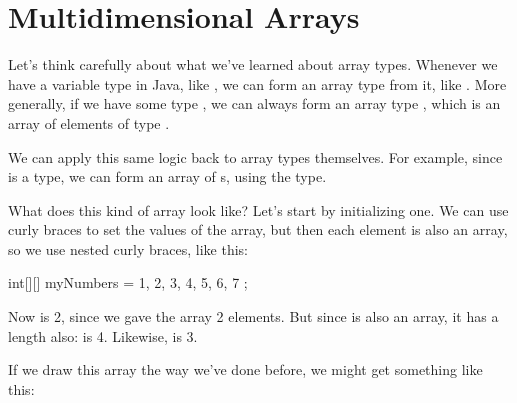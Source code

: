 





\section{Multidimensional Arrays}

Let's think carefully about what we've learned about array types. Whenever we have a variable type in Java, like , we can form an array type from it, like . More generally, if we have some type , we can always form an array type , which is an array of elements of type .

We can apply this same logic back to array types themselves. For example, since  is a type, we can form an array of s, using the  type.

What does this kind of array look like? Let's start by initializing one. We can use curly braces to set the values of the array, but then each element is also an array, so we use nested curly braces, like this:
\begin{code}
int[][] myNumbers = { {1, 2, 3, 4}, {5, 6, 7} };
\end{code}
Now  is 2, since we gave the array 2 elements. But since  is also an array, it has a length also:  is 4. Likewise,  is 3.

If we draw this array the way we've done before, we might get something like this:
\begin{center}
\end{center}

